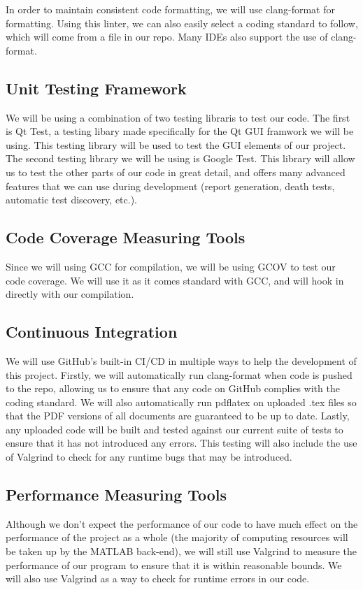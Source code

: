 \documentclass{article}
\begin{document}
In order to maintain consistent code formatting, we will use clang-format for formatting. Using this linter, 
we can also easily select a coding standard to follow, which will come from a file in our repo. Many IDEs
also support the use of clang-format. 

\subsection{Unit Testing Framework}
We will be using a combination of two testing libraris to test our code. The first is Qt Test, a testing libary made specifically for the Qt GUI framwork we will be using. This testing library will be used to test the GUI elements of our project.
The second testing library we will be using is Google Test. This library will allow us to test the other parts of our code in great detail, and offers many advanced features that we can use during development (report generation, death tests, automatic test discovery, etc.).

\subsection{Code Coverage Measuring Tools}
Since we will using GCC for compilation, we will be using GCOV to test our code coverage. We will use it as
it comes standard with GCC, and will hook in directly with our compilation.

\subsection{Continuous Integration}
We will use GitHub's built-in CI/CD in multiple ways to help the development of this project. Firstly, we will automatically run clang-format when code is pushed to the repo, allowing us to ensure that any code on GitHub complies with the coding standard.
We will also automatically run pdflatex on uploaded .tex files so that the PDF versions of all documents are guaranteed to be up to date. Lastly, any uploaded code will be built and tested against our current suite of tests to ensure that it has not introduced any errors.
This testing will also include the use of Valgrind to check for any runtime bugs that may be introduced.

\subsection{Performance Measuring Tools}
Although we don't expect the performance of our code to have much effect on the performance of the project as a whole (the majority of computing resources will be taken up by the MATLAB back-end), we will still use Valgrind to measure the performance of our program to ensure that
it is within reasonable bounds. We will also use Valgrind as a way to check for runtime errors in our code.
\end{document}
